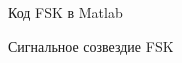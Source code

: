 \documentclass[a4paper,14pt]{extarticle}
\begin{document}
\begin{figure}[H]
\caption{Код FSK в Matlab}
\label{11}
\end{figure}

\begin{figure}[H]
\caption{Сигнальное созвездие FSK}
\label{12}
\end{figure}
\end{document}
